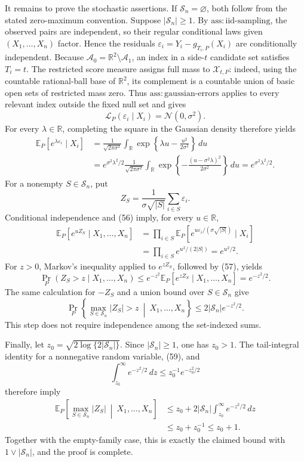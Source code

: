 It remains to prove the stochastic assertions.  If \(\mathscr S_n=\varnothing\), both follow from the stated zero-maximum convention.  Suppose \(|\mathscr S_n|\ge1\).  By \(\mathrm{ass:iid\text{-}sampling}\), the observed pairs are independent, so their regular conditional laws given \((X_1,\ldots,X_n)\) factor.  Hence the residuals \(\varepsilon_i=Y_i-g_{T_i,P}(X_i)\) are conditionally independent.  Because \(\mathcal A_0=\mathbb R^2\setminus\mathcal A_1\), an index in a side-\(t\) candidate set satisfies \(T_i=t\).  The restricted score measure assigns full mass to \(\mathcal X_{t,P}\): indeed, using the countable rational-ball base of \(\mathbb R^2\), its complement is a countable union of basic open sets of restricted mass zero.  Thus \(\mathrm{ass:gaussian\text{-}errors}\) applies to every relevant index outside the fixed null set and gives
\[
 \mathcal L_P(\varepsilon_i\mid X_i)=\mathcal N(0,\sigma^2).
\]
For every \(\lambda\in\mathbb R\), completing the square in the Gaussian density therefore yields
\[
 \begin{aligned}
 \mathbb E_P\!\left[e^{\lambda\varepsilon_i}\mid X_i\right]
 &=\frac{1}{\sqrt{2\pi\sigma^2}}
 \int_{\mathbb R}\exp\!\left\{\lambda u-\frac{u^2}{2\sigma^2}\right\}\,du\\
 &=e^{\sigma^2\lambda^2/2}
 \frac{1}{\sqrt{2\pi\sigma^2}}
 \int_{\mathbb R}\exp\!\left\{-\frac{(u-\sigma^2\lambda)^2}{2\sigma^2}\right\}\,du
 =e^{\sigma^2\lambda^2/2}.
 \end{aligned} \tag{56}
\]
For a nonempty \(S\in\mathscr S_n\), put
\[
 Z_S=\frac{1}{\sigma\sqrt{|S|}}\sum_{i\in S}\varepsilon_i.
\]
Conditional independence and (56) imply, for every \(u\in\mathbb R\),
\[
 \begin{aligned}
 \mathbb E_P\!\left[e^{uZ_S}\mid X_1,\ldots,X_n\right]
 &=\prod_{i\in S}
 \mathbb E_P\!\left[
 e^{u\varepsilon_i/(\sigma\sqrt{|S|})}\mid X_i
 \right]\\
 &=\prod_{i\in S}e^{u^2/(2|S|)}
 =e^{u^2/2}.
 \end{aligned} \tag{57}
\]
For \(z>0\), Markov's inequality applied to \(e^{zZ_S}\), followed by (57), yields
\[
 \Pr_P(Z_S>z\mid X_1,\ldots,X_n)
 \le e^{-z^2}\mathbb E_P[e^{zZ_S}\mid X_1,\ldots,X_n]
 =e^{-z^2/2}. \tag{58}
\]
The same calculation for \(-Z_S\) and a union bound over \(S\in\mathscr S_n\) give
\[
 \Pr_P\left\{\max_{S\in\mathscr S_n}|Z_S|>z
 \ \middle|\ X_1,\ldots,X_n\right\}
 \le2|\mathscr S_n|e^{-z^2/2}. \tag{59}
\]
This step does not require independence among the set-indexed sums.

Finally, let \(z_0=\sqrt{2\log\{2|\mathscr S_n|\}}\).  Since \(|\mathscr S_n|\ge1\), one has \(z_0>1\).  The tail-integral identity for a nonnegative random variable, (59), and
\[
 \int_{z_0}^{\infty}e^{-z^2/2}\,dz
 \le z_0^{-1}e^{-z_0^2/2}
\]
therefore imply
\[
 \begin{aligned}
 \mathbb E_P\!\left[\max_{S\in\mathscr S_n}|Z_S|
 \ \middle|\ X_1,\ldots,X_n\right]
 &\le z_0+2|\mathscr S_n|\int_{z_0}^{\infty}e^{-z^2/2}\,dz\\
 &\le z_0+z_0^{-1}\le z_0+1.
 \end{aligned}
\]
Together with the empty-family case, this is exactly the claimed bound with \(1\vee|\mathscr S_n|\), and the proof is complete.